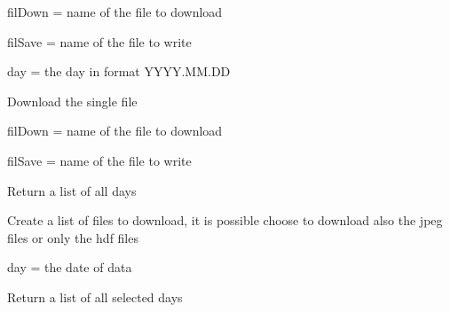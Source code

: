 \documentclass[a4paper,11pt,oneside]{sphinxmanual}
\begin{document}
\begin{fulllineitems}
\begin{fulllineitems}
filDown = name of the file to download

filSave = name of the file to write

day = the day in format YYYY.MM.DD

\end{fulllineitems}


\begin{fulllineitems}
\label{pymodis/pymodis:pymodis.downmodis.downModis.downloadsAllDay}
Download the single file

filDown = name of the file to download

filSave = name of the file to write

\end{fulllineitems}


\begin{fulllineitems}
\label{pymodis/pymodis:pymodis.downmodis.downModis.getAllDays}
Return a list of all days

\end{fulllineitems}


\begin{fulllineitems}
\label{pymodis/pymodis:pymodis.downmodis.downModis.getFilesList}
Create a list of files to download, it is possible choose to
download also the jpeg files or only the hdf files

day = the date of data

\end{fulllineitems}


\begin{fulllineitems}
\label{pymodis/pymodis:pymodis.downmodis.downModis.getListDays}
Return a list of all selected days

\end{fulllineitems}



\end{fulllineitems}
\end{document}
